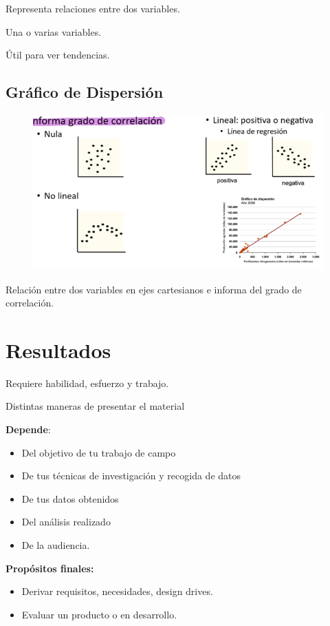 \documentclass[12pt, twoside, openright]{report} %
\begin{document}
Representa relaciones entre dos variables.

Una o varias variables.

Útil para ver tendencias.

\subsection{Gráfico de
	Dispersión}

\begin{figure}[H]
	{\includegraphics[scale=.5]{Untitled 10.png}}
\end{figure}

Relación entre dos variables en ejes cartesianos e informa del grado de
correlación.
\pagebreak
\section{Resultados}

Requiere habilidad, esfuerzo y trabajo.

Distintas maneras de presentar el material

\textbf{Depende}:

\begin{itemize}
	\item Del objetivo de tu trabajo de campo
	\item De tus técnicas de investigación y recogida de datos
	\item De tus datos obtenidos
	\item Del análisis realizado
	\item De la audiencia.
\end{itemize}

\textbf{Propósitos finales:}

\begin{itemize}
	\item Derivar requisitos, necesidades, design drives.
	\item Evaluar un producto o en desarrollo.
\end{itemize}
\end{document}
